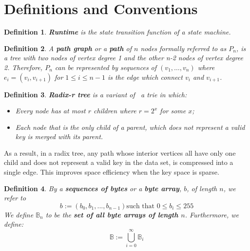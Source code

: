 \documentclass{article}
\newcommand{\assign}{:=}
\newcommand{\tmstrong}[1]{\textbf{#1}}
\newcommand{\tmtextbf}[1]{{\bfseries{#1}}}
\newcommand{\tmtexttt}[1]{{\ttfamily{#1}}}
\newcommand{\tmverbatim}[1]{{\ttfamily{#1}}}
\newtheorem{definition}{Definition}
\providecommand{\tmstrong}[1]{\tmtextbf{#1}}
\providecommand{\tmtextbf}[1]{\tmtextbf{#1}}
\providecommand{\tmverbatim}[1]{\tmtexttt{#1}}
\newtheorem{definition}{Definition}
\begin{document}
\section{Definitions and Conventions}\label{sect-defn-conv}

\begin{definition}
  \label{defn-runtime}{\tmstrong{Runtime}} is the state transition function of
  a state machine.\tmverbatim{}
\end{definition}

\begin{definition}
  \label{defn-path-graph}A {\tmstrong{path graph}} or a {\tmstrong{path}} of
  $n$ nodes formally referred to as {\tmstrong{$P_n$}}, is a tree with two
  nodes of vertex degree 1 and the other n-2 nodes of vertex degree 2.
  Therefore, $P_n$ can be represented by sequences of $(v_1, \ldots, v_n)$
  where $e_i = (v_i, v_{i + 1})$ for $1 \leqslant i \leqslant n - 1$ is the
  edge which connect $v_i$ and $v_{i + 1}$.
\end{definition}

\begin{definition}
  \label{defn-radix-tree}{\tmstrong{Radix-r tree}} is a variant of \ a trie in
  which:
  \begin{itemize}
    \item Every node has at most $r$ children where $r = 2^x$ for some $x$;
    
    \item Each node that is the only child of a parent, which does not
    represent a valid key is merged with its parent.
  \end{itemize}
\end{definition}

As a result, in a radix tree, any path whose interior vertices all have only
one child and does not represent a valid key in the data set, is compressed
into a single edge. This improves space efficiency when the key space is
sparse.

\begin{definition}
  By a {\tmstrong{sequences of bytes}} or a {\tmstrong{byte array}}, $b$, of
  length $n$, we refer to
  \[ b \assign (b_0, b_1, ..., b_{n - 1})  \text{such that } 0 \leqslant b_i
     \leqslant 255 \]
  We define $\mathbb{B}_n$ to be the {\tmstrong{set of all byte arrays of
  length $n$}}. Furthermore, we define:
  \[ \mathbb{B} \assign \bigcup^{\infty}_{i = 0} \mathbb{B}_i \]
\end{definition}
\end{document}

